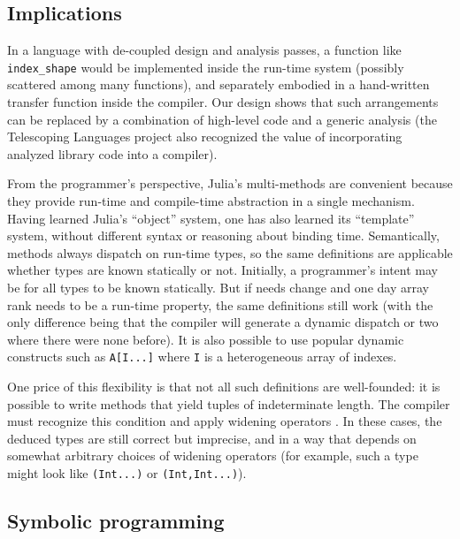 \documentclass[preprint]{sigplanconf}
\newcommand{\code}[1]{\texttt{#1}}
\begin{document}
\subsection{Implications}

In a language with de-coupled design and analysis passes, a function like
\code{index\_shape} would be implemented inside the run-time system
(possibly scattered among many functions), and separately embodied in
a hand-written transfer function inside the compiler. Our design shows
that such arrangements can be replaced by a combination of high-level code and
a generic analysis (the Telescoping Languages project \cite{telescoping}
also recognized the value of incorporating analyzed library code into a
compiler).

From the programmer's perspective, Julia's multi-methods are convenient
because they provide run-time and compile-time abstraction in a single
mechanism. Having learned Julia's ``object'' system, one has also learned
its ``template'' system, without different syntax or reasoning about
binding time. Semantically, methods always dispatch on run-time
types, so the same definitions are applicable whether types are known
statically or not. Initially, a programmer's intent may be for all types
to be known statically. But if needs change and one day array rank needs
to be a run-time property, the same definitions still work (with the only
difference being that the compiler will generate a dynamic dispatch or
two where there were none before). It is also possible to use popular
dynamic constructs such as \code{A[I...]} where \code{I} is a heterogeneous
array of indexes.

One price of this flexibility is that not all such definitions are well-founded:
it is possible to write methods that yield tuples of indeterminate length.
The compiler must recognize this condition and apply widening operators
\cite{Cousot:1977, widening}. In these cases, the deduced types are
still correct but imprecise, and in a way that depends on somewhat arbitrary
choices of widening operators (for example, such a type might look
like \code{(Int...)} or \code{(Int,Int...)}).


\subsection{Symbolic programming}
\end{document}
